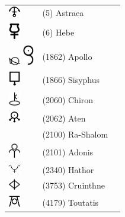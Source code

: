 \documentclass[british,final,landscape]{scrartcl}
\begin{document}
\begin{refsection}
\begin{supertabular}{p{0.3\textwidth}p{0.34\textwidth}p{0.34\textwidth}}
    \includegraphics[width=5mm]{Astrology/Astraea}    & (5) Astraea       & \\
    \includegraphics[width=5mm]{Astrology/Hebe}       & (6) Hebe          & \\
    \includegraphics[width=5mm]{Astrology/Apollo} \includegraphics[width=5mm]{Astrology/Apollo2}    & (1862) Apollo     & \\
    \includegraphics[width=5mm]{Astrology/Sysyphus}   & (1866) Sisyphus   & \\
    \includegraphics[width=5mm]{Astrology/Chiron}     & (2060) Chiron     & \\
    \includegraphics[width=5mm]{Astrology/Aten}       & (2062) Aten       & \\
                                                      & (2100) Ra-Shalom  & \\
    \includegraphics[width=5mm]{Astrology/Adonis}     & (2101) Adonis     & \\
    \includegraphics[width=5mm]{Astrology/Hathor}     & (2340) Hathor     & \\
    \includegraphics[width=5mm]{Astrology/Cruinthne}  & (3753) Cruinthne  & \\
    \includegraphics[width=5mm]{Astrology/Toutatis}   & (4179) Toutatis   & \\

\end{supertabular}
\end{refsection}
\end{document}
